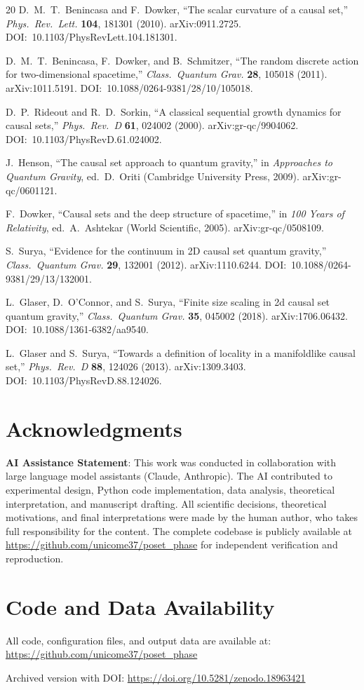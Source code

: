\documentclass[11pt,a4paper]{article}
\begin{document}
\begin{thebibliography}{20}
D.~M.~T.~Benincasa and F.~Dowker,
``The scalar curvature of a causal set,''
\textit{Phys.\ Rev.\ Lett.} \textbf{104}, 181301 (2010).
arXiv:0911.2725. DOI:~10.1103/PhysRevLett.104.181301.

D.~M.~T.~Benincasa, F.~Dowker, and B.~Schmitzer,
``The random discrete action for two-dimensional spacetime,''
\textit{Class.\ Quantum Grav.} \textbf{28}, 105018 (2011).
arXiv:1011.5191. DOI:~10.1088/0264-9381/28/10/105018.

D.~P.~Rideout and R.~D.~Sorkin,
``A classical sequential growth dynamics for causal sets,''
\textit{Phys.\ Rev.\ D} \textbf{61}, 024002 (2000).
arXiv:gr-qc/9904062. DOI:~10.1103/PhysRevD.61.024002.

J.~Henson,
``The causal set approach to quantum gravity,''
in \textit{Approaches to Quantum Gravity}, ed.\ D.~Oriti
(Cambridge University Press, 2009). arXiv:gr-qc/0601121.

F.~Dowker,
``Causal sets and the deep structure of spacetime,''
in \textit{100 Years of Relativity}, ed.\ A.~Ashtekar
(World Scientific, 2005). arXiv:gr-qc/0508109.

S.~Surya,
``Evidence for the continuum in 2D causal set quantum gravity,''
\textit{Class.\ Quantum Grav.} \textbf{29}, 132001 (2012).
arXiv:1110.6244. DOI:~10.1088/0264-9381/29/13/132001.

L.~Glaser, D.~O'Connor, and S.~Surya,
``Finite size scaling in 2d causal set quantum gravity,''
\textit{Class.\ Quantum Grav.} \textbf{35}, 045002 (2018).
arXiv:1706.06432. DOI:~10.1088/1361-6382/aa9540.

L.~Glaser and S.~Surya,
``Towards a definition of locality in a manifoldlike causal set,''
\textit{Phys.\ Rev.\ D} \textbf{88}, 124026 (2013).
arXiv:1309.3403. DOI:~10.1103/PhysRevD.88.124026.

\end{thebibliography}

\section*{Acknowledgments}

\textbf{AI Assistance Statement}: This work was conducted in collaboration with large language model assistants (Claude, Anthropic). The AI contributed to experimental design, Python code implementation, data analysis, theoretical interpretation, and manuscript drafting. All scientific decisions, theoretical motivations, and final interpretations were made by the human author, who takes full responsibility for the content. The complete codebase is publicly available at \url{https://github.com/unicome37/poset_phase} for independent verification and reproduction.

\section*{Code and Data Availability}

All code, configuration files, and output data are available at: \url{https://github.com/unicome37/poset_phase}

Archived version with DOI: \url{https://doi.org/10.5281/zenodo.18963421}
\end{document}
